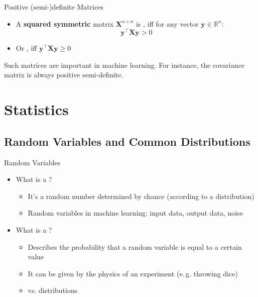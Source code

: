 \begin{frame}{Positive (semi-)definite Matrices}{}
	\begin{itemize}
		\item A \textbf{squared symmetric} matrix $\bm{X}^{n \times n}$ is ,
			iff for any vector $\bm{y} \in \mathbb{R}^n$:
		\begin{equation}
			\bm{y}^{\intercal} \bm{X} \bm{y} > 0
		\end{equation}
		\item Or , iff $\bm{y}^{\intercal} \bm{X} \bm{y} \ge 0$
	\end{itemize}
	
	\vspace*{3mm}
	\begin{boxBlueNoFrame}
		Such matrices are important in machine learning. For instance, the covariance matrix is always positive semi-definite.
	\end{boxBlueNoFrame}
\end{frame}


\section{Statistics}


\subsection{Random Variables and Common Distributions}

\begin{frame}{Random Variables}{}
	\begin{itemize}
		\item What is a ? \pause
		\begin{itemize}
			\item It's a random number determined by chance (according to a distribution)
			\item Random variables in machine learning: input data, output data, noise
		\end{itemize}
		\item What is a ? \pause
		\begin{itemize}
			\item Describes the probability that a random variable is equal to a certain value
			\item It can be given by the physics of an experiment (e.\,g. throwing dice)
			\item {} vs.  distributions
		\end{itemize}
	\end{itemize}
\end{frame}


